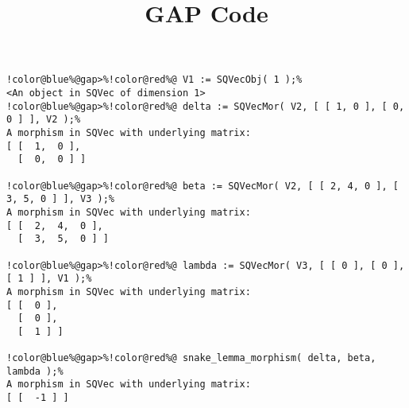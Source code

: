 \documentclass[12pt]{amsart}
\title{GAP Code}
\author{}
\begin{document}
\maketitle

\begin{Verbatim}[commandchars=!@\%,frame=single]
!color@blue%@gap>%!color@red%@ V1 := SQVecObj( 1 );%
<An object in SQVec of dimension 1>
!color@blue%@gap>%!color@red%@ delta := SQVecMor( V2, [ [ 1, 0 ], [ 0, 0 ] ], V2 );%
A morphism in SQVec with underlying matrix:
[ [  1,  0 ],
  [  0,  0 ] ]

!color@blue%@gap>%!color@red%@ beta := SQVecMor( V2, [ [ 2, 4, 0 ], [ 3, 5, 0 ] ], V3 );%
A morphism in SQVec with underlying matrix:
[ [  2,  4,  0 ],
  [  3,  5,  0 ] ]

!color@blue%@gap>%!color@red%@ lambda := SQVecMor( V3, [ [ 0 ], [ 0 ], [ 1 ] ], V1 );%
A morphism in SQVec with underlying matrix:
[ [  0 ],
  [  0 ],
  [  1 ] ]

!color@blue%@gap>%!color@red%@ snake_lemma_morphism( delta, beta, lambda );%
A morphism in SQVec with underlying matrix:
[ [  -1 ] ]

\end{Verbatim}
\end{document}
